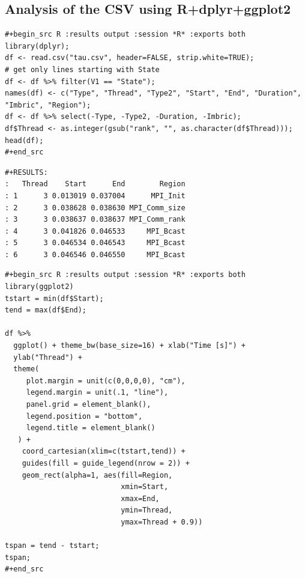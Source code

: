 \documentclass[10pt,twoside]{article}   	%
\begin{document}
\subsection*{Analysis of the CSV using R+dplyr+ggplot2}

\lstset{language=R}
\begin{lstlisting}[caption=Code in R that analyses the CVS file (written in emacs using org mode)]
#+begin_src R :results output :session *R* :exports both  
library(dplyr);
df <- read.csv("tau.csv", header=FALSE, strip.white=TRUE);
# get only lines starting with State
df <- df %>% filter(V1 == "State");
names(df) <- c("Type", "Thread", "Type2", "Start", "End", "Duration", "Imbric", "Region");
df <- df %>% select(-Type, -Type2, -Duration, -Imbric);
df$Thread <- as.integer(gsub("rank", "", as.character(df$Thread)));
head(df);
#+end_src
\end{lstlisting}

\lstset{language=R}
\begin{lstlisting}[caption=Results]
#+RESULTS:
:   Thread    Start      End        Region
: 1      3 0.013019 0.037004      MPI_Init
: 2      3 0.038628 0.038630 MPI_Comm_size
: 3      3 0.038637 0.038637 MPI_Comm_rank
: 4      3 0.041826 0.046533     MPI_Bcast
: 5      3 0.046534 0.046543     MPI_Bcast
: 6      3 0.046546 0.046550     MPI_Bcast
\end{lstlisting}

\lstset{language=R}
\begin{lstlisting}[caption=Code in R that analyses the CVS file (written in emacs using org mode)]
#+begin_src R :results output :session *R* :exports both
library(ggplot2)
tstart = min(df$Start);
tend = max(df$End);

df %>%
  ggplot() + theme_bw(base_size=16) + xlab("Time [s]") +
  ylab("Thread") +
  theme(
     plot.margin = unit(c(0,0,0,0), "cm"),
     legend.margin = unit(.1, "line"),
     panel.grid = element_blank(),
     legend.position = "bottom",
     legend.title = element_blank()
   ) +
    coord_cartesian(xlim=c(tstart,tend)) +
    guides(fill = guide_legend(nrow = 2)) +
    geom_rect(alpha=1, aes(fill=Region,
                           xmin=Start,
                           xmax=End,
                           ymin=Thread,
                           ymax=Thread + 0.9))

tspan = tend - tstart;
tspan;
#+end_src
\end{lstlisting}

\lstset{language=R}
\begin{lstlisting}[caption=Results]
\end{lstlisting}
\vspace{-.5cm}
\end{document}
